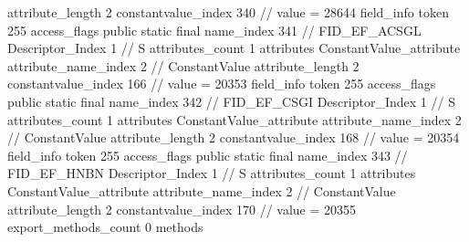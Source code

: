 {{{{{{{					attribute_length	2
					constantvalue_index	340		// value = 28644
				}
				}
			}
			field_info {
				token	255
				access_flags	public static final
				name_index	341		// FID_EF_ACSGL
				Descriptor_Index	1		// S
				attributes_count	1
				attributes {
				ConstantValue_attribute {
					attribute_name_index	2		// ConstantValue
					attribute_length	2
					constantvalue_index	166		// value = 20353
				}
				}
			}
			field_info {
				token	255
				access_flags	public static final
				name_index	342		// FID_EF_CSGI
				Descriptor_Index	1		// S
				attributes_count	1
				attributes {
				ConstantValue_attribute {
					attribute_name_index	2		// ConstantValue
					attribute_length	2
					constantvalue_index	168		// value = 20354
				}
				}
			}
			field_info {
				token	255
				access_flags	public static final
				name_index	343		// FID_EF_HNBN
				Descriptor_Index	1		// S
				attributes_count	1
				attributes {
				ConstantValue_attribute {
					attribute_name_index	2		// ConstantValue
					attribute_length	2
					constantvalue_index	170		// value = 20355
				}
				}
			}
			}
			export_methods_count	0
			methods {
			}
		}
	}
}
